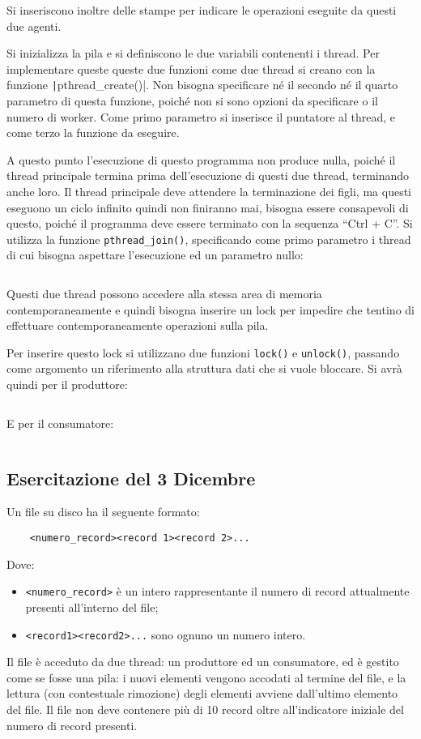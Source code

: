 \documentclass{article}
\numberwithin{equation}{subsection}
\begin{document}
Si inseriscono inoltre delle stampe per indicare le operazioni eseguite 
da questi due agenti. 

Si inizializza la pila e si definiscono le due variabili contenenti 
i thread. 
Per implementare queste queste due funzioni come due thread si creano 
con la funzione \texttt|pthread\_create()|. Non bisogna specificare né il 
secondo né il quarto parametro di questa funzione, poiché non si sono 
opzioni da specificare o il numero di worker. Come primo parametro si 
inserisce il puntatore al thread, e come terzo la funzione da eseguire. 

A questo punto l'esecuzione di questo programma non produce nulla, poiché il thread 
principale termina prima dell'esecuzione di questi due thread, terminando 
anche loro. 
Il thread principale deve attendere la terminazione dei figli, ma questi 
eseguono un ciclo infinito quindi non finiranno mai, bisogna essere 
consapevoli di questo, poiché il programma deve essere terminato con la 
sequenza ``Ctrl + C''. Si utilizza la funzione \verb|pthread_join()|, 
specificando come primo parametro i thread di cui bisogna aspettare l'esecuzione 
ed un parametro nullo:
\inputminted[firstline=70, lastline=79]{c}{./"Programmazione Concorrente"/consumatore_produttore.c} 
Questi due thread possono accedere alla stessa area di memoria 
contemporaneamente e quindi bisogna inserire un lock per impedire che 
tentino di effettuare contemporaneamente operazioni sulla pila. 

Per inserire questo lock si utilizzano due funzioni \verb|lock()| 
e \verb|unlock()|, passando come argomento un riferimento alla struttura dati 
che si vuole bloccare. Si avrà quindi per il produttore:
\inputminted[firstline=38, lastline=53]{c}{./"Programmazione Concorrente"/consumatore_produttore.c}
E per il consumatore:
\inputminted[firstline=55, lastline=67]{c}{./"Programmazione Concorrente"/consumatore_produttore.c}

\subsection{Esercitazione del 3 Dicembre}

Un file su disco ha il seguente formato:
\begin{verbatim}
    <numero_record><record 1><record 2>...
\end{verbatim}
Dove: 
\begin{itemize}
    \item \verb|<numero_record>| è un intero rappresentante il numero di record attualmente presenti all'interno del file;
    \item \verb|<record1><record2>...| sono ognuno un numero intero.
\end{itemize}
Il file è acceduto da due thread: un produttore ed un consumatore, ed è gestito come se fosse una pila: i nuovi elementi vengono accodati al termine del file, e la lettura (con contestuale rimozione) degli elementi avviene dall'ultimo elemento del file. Il file non deve contenere più di 10 record oltre all'indicatore iniziale del numero di record presenti.
\end{document}
